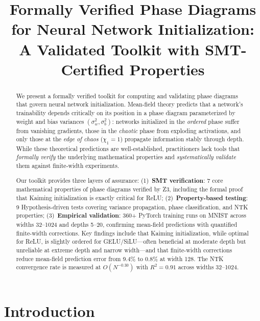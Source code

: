 \documentclass[10pt]{article}
\title{Formally Verified Phase Diagrams for Neural Network Initialization:\\A Validated Toolkit with SMT-Certified Properties}
\date{}
\begin{document}
\maketitle

\begin{abstract}
We present a formally verified toolkit for computing and validating phase diagrams that govern neural network initialization.
Mean-field theory predicts that a network's trainability depends critically on its position in a phase diagram parameterized by weight and bias variances $(\sigma_w^2, \sigma_b^2)$: networks initialized in the \emph{ordered} phase suffer from vanishing gradients, those in the \emph{chaotic} phase from exploding activations, and only those at the \emph{edge of chaos} ($\chi_1 = 1$) propagate information stably through depth.
While these theoretical predictions are well-established, practitioners lack tools that \emph{formally verify} the underlying mathematical properties and \emph{systematically validate} them against finite-width experiments.

Our toolkit provides three layers of assurance:
(1)~\textbf{SMT verification}: 7 core mathematical properties of phase diagrams verified by Z3, including the formal proof that Kaiming initialization is exactly critical for ReLU;
(2)~\textbf{Property-based testing}: 9 Hypothesis-driven tests covering variance propagation, phase classification, and NTK properties;
(3)~\textbf{Empirical validation}: 360+ PyTorch training runs on MNIST across widths 32--1024 and depths 5--20, confirming mean-field predictions with quantified finite-width corrections.
Key findings include that Kaiming initialization, while optimal for ReLU, is slightly ordered for GELU/SiLU---often beneficial at moderate depth but unreliable at extreme depth and narrow width---and that finite-width corrections reduce mean-field prediction error from 9.4\% to 0.8\% at width 128.
The NTK convergence rate is measured at $O(N^{-0.30})$ with $R^2=0.91$ across widths 32--1024.
\end{abstract}

\section{Introduction}
\label{sec:intro}
\end{document}
